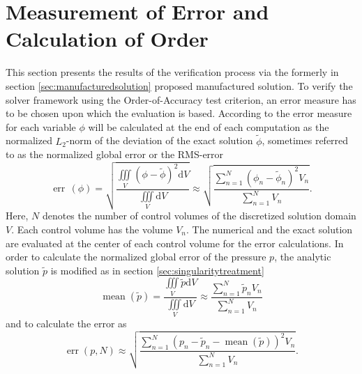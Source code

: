 \section{Measurement of Error and Calculation of Order}
\label{sec:error}

This section presents the results of the verification process via the formerly in section \ref{sec:manufacturedsolution} proposed manufactured solution. To verify the solver framework using the Order-of-Accuracy test criterion, an error measure has to be chosen upon which the evaluation is based. According to \cite{salari00} the error measure for each variable \(\phi\) will be calculated at the end of each computation as the normalized \(L_2\)-norm of the deviation of the exact solution \(\tilde{\phi}\), sometimes referred to as the normalized global error or the RMS-error
\begin{displaymath}
  \operatorname{err}\,(\phi) = \sqrt{ \frac {\iiint\limits_V \left( \phi - \tilde{\phi} \right)^2 \mathrm{d}V }{\iiint\limits_V \mathrm{d}V }} \approx \sqrt{ \frac{ \sum_{n=1}^N \left(\phi_n - \tilde{\phi}_n \right)^2 V_n }{\sum_{n=1}^{N} V_n}} .
\end{displaymath}
Here, \(N\) denotes the number of control volumes of the discretized solution domain \(V\). Each control volume has the volume \(V_n\). The numerical and the exact solution are evaluated at the center of each control volume for the error calculations. In order to calculate the normalized global error of the pressure \(p\), the analytic solution \(\tilde{p}\) is modified as in section \ref{sec:singularitytreatment}
\begin{displaymath}
  \operatorname{mean}\left( \tilde{p} \right) = \frac{\iiint\limits_V \tilde{p} \mathrm{d}V}{\iiint\limits_V \mathrm{d}V} \approx \frac{\sum_{n=1}^N \tilde{p}_n V_n}{\sum_{n=1}^N V_n}
\end{displaymath}
and to calculate the error as
\begin{displaymath}
  \operatorname{err}(p,N) \approx \sqrt{ \frac{ \sum_{n=1}^N \left(p_n - \tilde{p}_n -\operatorname{mean}\left(\tilde{p}\right) \right)^2 V_n }{\sum_{n=1}^{N} V_n}}.
\end{displaymath}
